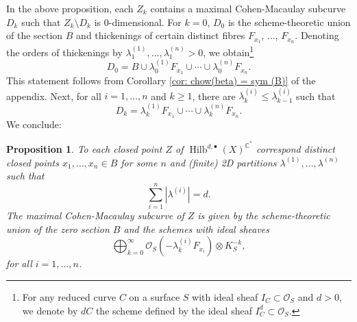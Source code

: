 \documentclass{amsart}
\newtheorem{proposition}[theorem]{Proposition}
\theoremstyle{definition}
\newcommand{\CC} {\mathbb{C}}          %
\renewcommand{\O}{\mathcal{O}}
\newcommand{\Hilb}{\operatorname{Hilb}}
\begin{document}
In the above proposition, each $Z_k$ contains a maximal Cohen-Macaulay subcurve $D_k$ such that $Z_k \setminus D_k$ is 0-dimensional. For $k=0$, $D_0$ is the scheme-theoretic union of the section $B$ and thickenings of certain distinct fibres $F_{x_1}$, $\ldots$, $F_{x_n}$. Denoting the orders of thickenings by $\lambda_{1}^{(1)}, \ldots, \lambda_{1}^{(n)} > 0$, we obtain\footnote{For any reduced curve $C$ on a surface $S$ with ideal sheaf $I_C \subset \O_S$ and $d>0$, we denote by $d C$ the scheme defined by the ideal sheaf $I_{C}^{d} \subset \O_S$.}
$$
D_0 = B \cup \lambda_{0}^{(1)} F_{x_1} \cup \cdots \cup \lambda_{0}^{(n)} F_{x_n}.
$$
This statement follows from Corollary \ref{cor: chow(beta) = sym (B)} of the appendix. Next, for all $i = 1, \ldots, n$ and $k \geq 1$, there are $\lambda_{k}^{(i)} \leq \lambda_{k-1}^{(i)}$ such that
$$
D_k = \lambda_{k}^{(1)} F_{x_1} \cup \cdots \cup \lambda_{k}^{(n)} F_{x_n}.
$$
We conclude:
\begin{proposition} \label{ZCM}
To each closed point $Z$ of $\Hilb^{d,\bullet}(X)^{\CC^*}$ correspond distinct closed points $x_1, \ldots, x_n \in B$ for some $n$ and (finite) 2D partitions $\lambda^{(1)}, \ldots, \lambda^{(n)}$ such that
$$
\sum_{i=1}^{n} |\lambda^{(i)}| = d.
$$
The maximal Cohen-Macaulay subcurve of $Z$ is given by the scheme-theoretic union of the zero section $B$ and the schemes with ideal sheaves
\begin{equation} \label{CMcurve}
\bigoplus_{k=0}^{\infty} \O_{S}(-\lambda_{k}^{(i)} F_{x_i}) \otimes K_{S}^{-k},
\end{equation}
for all $i = 1, \ldots, n$.
\end{proposition}
\end{document}
